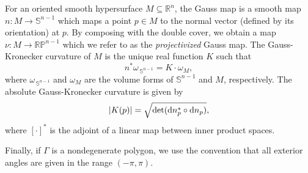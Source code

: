 For an oriented smooth hypersurface $M \subseteq \mathbb{R}^n$, the Gauss map is a smooth map $n \colon M \to \mathbb{S}^{n-1}$ which maps a point $p \in M$ to the normal vector (defined by its orientation) at $p$. By composing with the double cover, we obtain a map $\nu \colon M \to \mathbb{RP}^{n-1}$ which we refer to as the \textit{projectivized} Gauss map. The Gauss-Kronecker curvature of $M$ is the unique real function $K$ such that 
\begin{equation}
  n^*\omega_{\,\mathbb{S}^{n-1}} = K \cdot \omega_M,
\end{equation}
where $\omega_{\,\mathbb{S}^{n-1}}$ and $\omega_M$ are the volume forms of $\mathbb{S}^{n-1}$ and $M$, respectively. The absolute Gauss-Kronecker curvature is given by
\begin{equation}
  |K(p)| = \sqrt{\det({\rm d} n_p^{*} \circ {\rm d} n_p)},
\end{equation}
where $[\cdot]^*$ is the adjoint of a linear map between inner product spaces.

Finally, if $\Gamma$ is a nondegenerate polygon, we use the convention that all exterior angles are given in the range $(-\pi, \pi)$.
